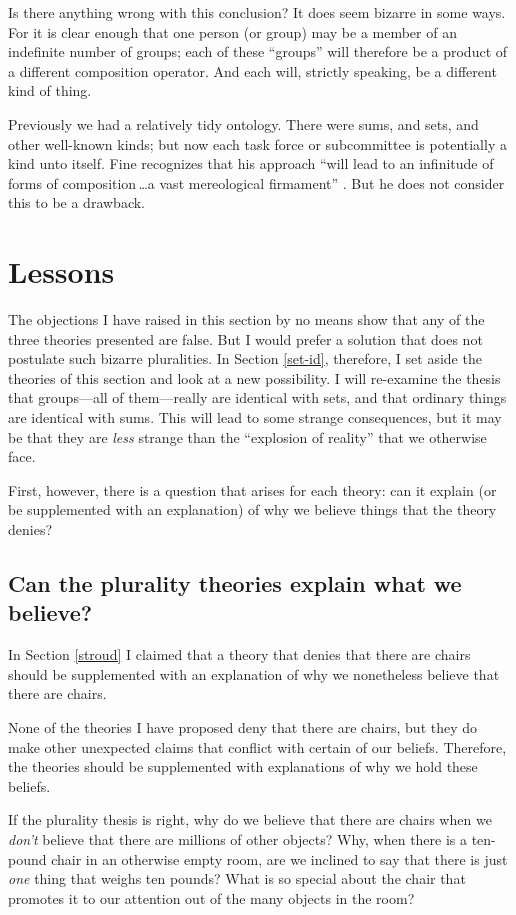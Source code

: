 \documentclass[11pt]{article}
\begin{document}
\begin{spacing}{1.5}
Is there anything wrong with this conclusion?  It does seem bizarre in
some ways.  For it is clear enough that one person (or group) may be a
member of an indefinite number of groups; each of these ``groups''
will therefore be a product of a different composition operator.  And
each will, strictly speaking, be a different kind of thing.

Previously we had a relatively tidy ontology.  There were sums, and
sets, and other well-known kinds; but now each task force or
subcommittee is potentially a kind unto itself.  Fine recognizes that
his approach ``will lead to an infinitude of forms of
composition\,\ldots a vast mereological firmament''
\citeyearpar[576]{fine2010}.  But he does not consider this to be a
drawback.

\section{Lessons}
\label{lessons-p}
The objections I have raised in this section by no means show that any
of the three theories presented are false.  But I would prefer a
solution that does not postulate such bizarre pluralities.  In Section
\ref{set-id}, therefore, I set aside the theories of this section and
look at a new possibility.  I will re-examine the thesis that
groups---all of them---really are identical with sets, and that
ordinary things are identical with sums.  This will lead to some
strange consequences, but it may be that they are {\em less} strange
than the ``explosion of reality'' that we otherwise face.

First, however, there is a question that arises for each theory: can
it explain (or be supplemented with an explanation) of why we believe
things that the theory denies?

\subsection{Can the plurality theories explain what we believe?}
\label{explain-p}
In Section \ref{stroud} I claimed that a theory that denies that there
are chairs should be supplemented with an explanation of why we
nonetheless believe that there are chairs.

None of the theories I have proposed deny that there are chairs, but
they do make other unexpected claims that conflict with certain of our
beliefs.  Therefore, the theories should be supplemented with
explanations of why we hold these beliefs.

If the plurality thesis is right, why do we believe that there are
chairs when we {\em don't} believe that there are millions of other
objects?  Why, when there is a ten-pound chair in an otherwise empty
room, are we inclined to say that there is just {\em one} thing that
weighs ten pounds?  What is so special about the chair that promotes
it to our attention out of the many objects in the room?


\end{spacing}
\end{document}
